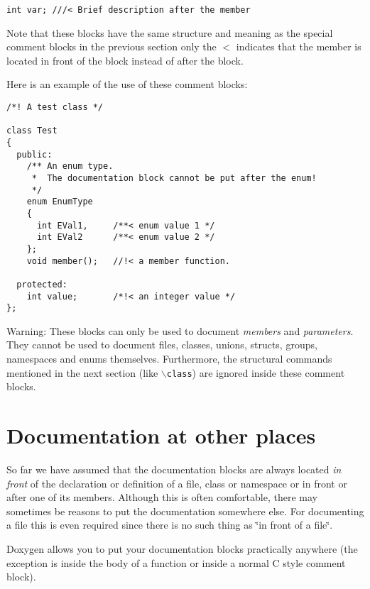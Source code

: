 \footnotesize\begin{verbatim}
int var; ///< Brief description after the member
\end{verbatim}
\normalsize


Note that these blocks have the same structure and meaning as the special comment blocks in the previous section only the $<$ indicates that the member is located in front of the block instead of after the block.

Here is an example of the use of these comment blocks: 

\begin{DocInclude}\begin{verbatim}/*! A test class */

class Test
{
  public:
    /** An enum type. 
     *  The documentation block cannot be put after the enum! 
     */
    enum EnumType
    {
      int EVal1,     /**< enum value 1 */
      int EVal2      /**< enum value 2 */
    };
    void member();   //!< a member function.
    
  protected:
    int value;       /*!< an integer value */
};
\end{verbatim}
\end{DocInclude}
 

\begin{Desc}
\item[Warning:]These blocks can only be used to document {\em members\/} and {\em parameters\/}. They cannot be used to document files, classes, unions, structs, groups, namespaces and enums themselves. Furthermore, the structural commands mentioned in the next section (like {\tt $\backslash$class}) are ignored inside these comment blocks.\end{Desc}
\hypertarget{docblocks_structuralcommands}{}\section{Documentation at other places}\label{docblocks_structuralcommands}
So far we have assumed that the documentation blocks are always located {\em in\/} {\em front\/} of the declaration or definition of a file, class or namespace or in front or after one of its members. Although this is often comfortable, there may sometimes be reasons to put the documentation somewhere else. For documenting a file this is even required since there is no such thing as \char`\"{}in front of a file\char`\"{}.

Doxygen allows you to put your documentation blocks practically anywhere (the exception is inside the body of a function or inside a normal C style comment block).

